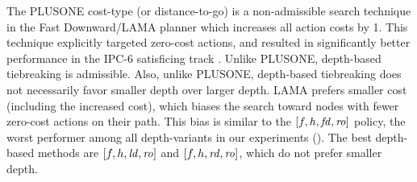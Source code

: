 The PLUSONE %
cost-type (or distance-to-go) is a non-admissible search technique in the Fast Downward/LAMA planner
\cite{richter2010lama} which increases all action costs by 1.
This technique explicitly targeted zero-cost actions,
and resulted in significantly better performance in the IPC-6
satisficing track \cite[p.137, Sec. 3.3.2]{richter2010lama}.
Unlike PLUSONE, depth-based tiebreaking is admissible.
Also, unlike PLUSONE, depth-based tiebreaking does not necessarily favor smaller depth over larger depth.
LAMA prefers smaller cost (including the increased cost),
which biases the search toward nodes with fewer zero-cost actions on their path.
This bias is similar to the $[f,h,{\mbox{\textit{fd}}},{\mbox{\textit{ro}}}]$ policy,
the worst performer among all depth-variants in our experiments ().
The best depth-based methods are  $[f,h,{\mbox{\textit{ld}}},{\mbox{\textit{ro}}}]$ and $[f,h,{\mbox{\textit{rd}}},{\mbox{\textit{ro}}}]$,
which do not prefer smaller depth.

